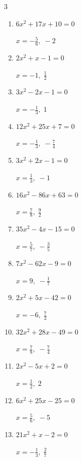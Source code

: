 \begin{multicols}{3}
\begin{enumerate}
        $\displaystyle x=-\frac{8}{5},\; -\frac{3}{2}$

  \item $6x^{2}+17x+10=0$

        $\displaystyle x=-\frac{5}{6},\; -2$

  \item $2x^{2}+x-1=0$

        $\displaystyle x=-1,\; \frac{1}{2}$

  \item $3x^{2}-2x-1=0$

        $\displaystyle x=-\frac{1}{3},\; 1$

  \item $12x^{2}+25x+7=0$

        $\displaystyle x=-\frac{1}{3},\; -\frac{7}{4}$

  \item $3x^{2}+2x-1=0$

        $\displaystyle x=\frac{1}{3},\; -1$

\columnbreak %

  \item $16x^{2}-86x+63=0$

        $\displaystyle x=\frac{7}{8},\; \frac{9}{2}$

  \item $35x^{2}-4x-15=0$

        $\displaystyle x=\frac{5}{7},\; -\frac{3}{5}$

  \item $7x^{2}-62x-9=0$

        $\displaystyle x=9,\; -\frac{1}{7}$

  \item $2x^{2}+5x-42=0$

        $\displaystyle x=-6,\; \frac{7}{2}$

  \item $32x^{2}+28x-49=0$

        $\displaystyle x=\frac{7}{8},\; -\frac{7}{4}$

  \item $2x^{2}-5x+2=0$

        $\displaystyle x=\frac{1}{2},\; 2$

  \item $6x^{2}+25x-25=0$

        $\displaystyle x=\frac{5}{6},\; -5$

  \item $21x^{2}+x-2=0$

        $\displaystyle x=-\frac{1}{3},\; \frac{2}{7}$


\end{enumerate}
\end{multicols}
